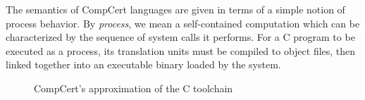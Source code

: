 \documentclass[draft,11pt]{report}
\begin{document}
The semantics of CompCert languages
are given in terms of a simple notion of process behavior.
By \emph{process}, we mean a self-contained computation
which can be characterized by
the sequence of system calls it performs.
For a C program to be executed as a process,
its translation units must be compiled to object files,
then linked together
into an executable binary
loaded by the system.

\begin{figure} %
  \centering
    \caption{CompCert's approximation of the C toolchain}
    \label{fig:process}
\end{figure}
\end{document}
